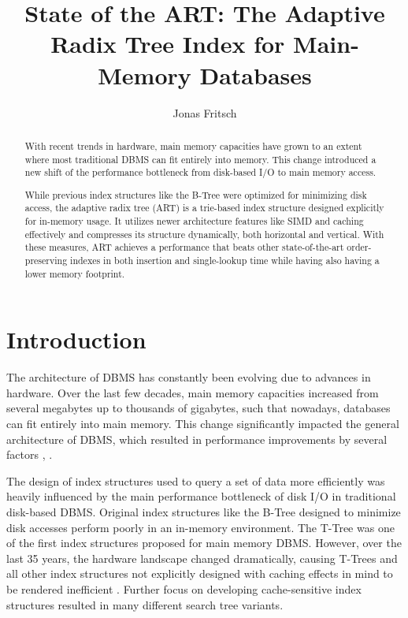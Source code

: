 \documentclass[acmtog, nonacm]{acmart}
\begin{document}
\title{State of the ART: The Adaptive Radix Tree Index for Main-Memory Databases}

\author{Jonas Fritsch}

\begin{abstract}
    With recent trends in hardware, main memory capacities have grown to an extent where most traditional DBMS 
    can fit entirely into memory. This change introduced a new shift of the performance bottleneck 
    from disk-based I/O to main memory access.
    
    While previous index structures like the B-Tree were optimized for minimizing disk access, the 
    adaptive radix tree (ART) is a trie-based index structure designed explicitly for in-memory usage. 
    It utilizes newer architecture features like SIMD and caching effectively and compresses its structure 
    dynamically, both horizontal and vertical. With these measures, ART achieves a performance that beats 
    other state-of-the-art order-preserving indexes in both insertion and single-lookup time while having also
    having a lower memory footprint.
\end{abstract}

\maketitle

\section{Introduction}
The architecture of DBMS has constantly been evolving due to advances in hardware. 
Over the last few decades, main memory capacities increased from several megabytes up to thousands 
of gigabytes, such that nowadays, databases can fit entirely into main memory. This change significantly 
impacted the general architecture of DBMS, which resulted in performance improvements 
by several factors \cite{10.1145/1376616.1376713}, \cite{7097722}.

The design of index structures used to query a set of data more efficiently was heavily influenced 
by the main performance bottleneck of disk I/O in traditional disk-based DBMS. 
Original index structures like the B-Tree designed to minimize disk accesses perform poorly 
in an in-memory environment. 
The T-Tree \cite{lehman1985study} was one of the first index structures proposed for main memory DBMS. 
However, over the last 35 years, the hardware landscape changed dramatically, causing T-Trees 
and all other index structures not explicitly designed with caching effects in mind to be rendered 
inefficient \cite{rao1998cache}. Further focus on developing cache-sensitive index structures resulted in many 
different search tree variants.
\end{document}
